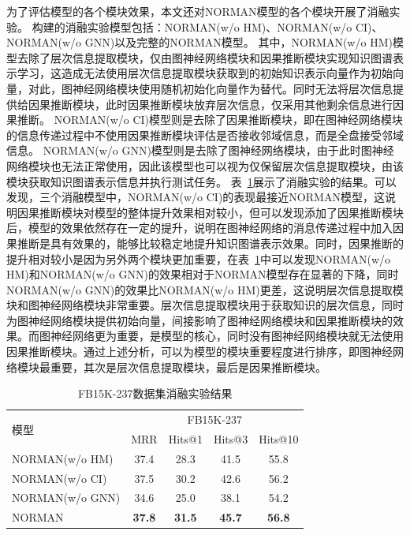 \documentclass[algorithmlist, AutoFakeBold, AutoFakeSlant, figurelist, tablelist, nomlist, masters]{seuthesix}
\begin{document}
为了评估模型的各个模块效果，本文还对NORMAN模型的各个模块开展了消融实验。
构建的消融实验模型包括：NORMAN(w/o HM)、NORMAN(w/o CI)、NORMAN(w/o GNN)以及完整的NORMAN模型。
其中，NORMAN(w/o HM)模型去除了层次信息提取模块，仅由图神经网络模块和因果推断模块实现知识图谱表示学习，这造成无法使用层次信息提取模块获取到的初始知识表示向量作为初始向量，对此，图神经网络模块使用随机初始化向量作为替代。同时无法将层次信息提供给因果推断模块，此时因果推断模块放弃层次信息，仅采用其他剩余信息进行因果推断。
NORMAN(w/o CI)模型则是去除了因果推断模块，即在图神经网络模块的信息传递过程中不使用因果推断模块评估是否接收邻域信息，而是全盘接受邻域信息。
NORMAN(w/o GNN)模型则是去除了图神经网络模块，由于此时图神经网络模块也无法正常使用，因此该模型也可以视为仅保留层次信息提取模块，由该模块获取知识图谱表示信息并执行测试任务。
表~\ref{Experiment1_ablation}展示了消融实验的结果。可以发现，三个消融模型中，NORMAN(w/o CI)的表现最接近NORMAN模型，这说明因果推断模块对模型的整体提升效果相对较小，但可以发现添加了因果推断模块后，模型的效果依然存在一定的提升，说明在图神经网络的消息传递过程中加入因果推断是具有效果的，能够比较稳定地提升知识图谱表示效果。同时，因果推断的提升相对较小是因为另外两个模块更加重要，在表~\ref{Experiment1_ablation}中可以发现NORMAN(w/o HM)和NORMAN(w/o GNN)的效果相对于NORMAN模型存在显著的下降，同时NORMAN(w/o GNN)的效果比NORMAN(w/o HM)更差，这说明层次信息提取模块和图神经网络模块非常重要。层次信息提取模块用于获取知识的层次信息，同时为图神经网络模块提供初始向量，间接影响了图神经网络模块和因果推断模块的效果。而图神经网络更为重要，是模型的核心，同时没有图神经网络模块就无法使用因果推断模块。通过上述分析，可以为模型的模块重要程度进行排序，即图神经网络模块最重要，其次是层次信息提取模块，最后是因果推断模块。
\begin{table}[]
  \centering
  \begin{tabular*}{0.95\textwidth}{@{\extracolsep{\fill}}lcccc}
  \toprule[1pt]
  \multirow{2}{*}{模型} & \multicolumn{4}{c}{FB15K-237} \\
    & MRR & Hits@1 & Hits@3 & Hits@10 \\ \hline
  NORMAN(w/o HM) & 37.4 & 28.3 & 41.5 & 55.8 \\
  NORMAN(w/o CI) & 37.5 & 30.2 & 42.6 & 56.2 \\
  NORMAN(w/o GNN) & 34.6 & 25.0 & 38.1 & 54.2 \\
  NORMAN & \textbf{37.8} & \textbf{31.5} & \textbf{45.7} & \textbf{56.8} \\
  \bottomrule[1pt]
  \end{tabular*}
  \caption{FB15K-237数据集消融实验结果}
  \label{Experiment1_ablation}
\end{table}
\end{document}
